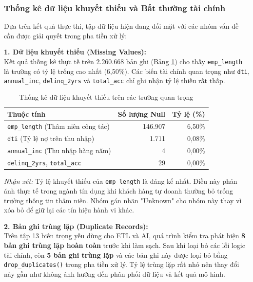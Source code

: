 \subsubsection{Thống kê dữ liệu khuyết thiếu và Bất thường tài chính}

Dựa trên kết quả thực thi, tập dữ liệu hiện đang đối mặt với các nhóm vấn đề cần được giải quyết trong pha tiền xử lý:

\textbf{1. Dữ liệu khuyết thiếu (Missing Values):} \\
Kết quả thống kê thực tế trên 2.260.668 bản ghi (Bảng \ref{tab:missing_values_updated}) cho thấy \texttt{emp\_length} là trường có tỷ lệ trống cao nhất (6,50\%). Các biến tài chính quan trọng như \texttt{dti}, \texttt{annual\_inc}, \texttt{delinq\_2yrs} và \texttt{total\_acc} chỉ ghi nhận tỷ lệ thiếu rất thấp.

\begin{table}[H]
    \centering
    \renewcommand{\arraystretch}{1.2}
    \begin{tabular}{|l|r|r|}
        \hline
        \textbf{Thuộc tính} & \textbf{Số lượng Null} & \textbf{Tỷ lệ (\%)} \\ \hline
        \texttt{emp\_length} (Thâm niên công tác) & 146.907 & 6,50\% \\ \hline
        \texttt{dti} (Tỷ lệ nợ trên thu nhập) & 1.711 & 0,08\% \\ \hline
        \texttt{annual\_inc} (Thu nhập hàng năm) & 4 & 0,00\% \\ \hline
        \texttt{delinq\_2yrs}, \texttt{total\_acc} & 29 & 0,00\% \\ \hline
    \end{tabular}
    \caption{Thống kê dữ liệu khuyết thiếu trên các trường quan trọng}
    \label{tab:missing_values_updated}
\end{table}

\textit{Nhận xét:} Tỷ lệ khuyết thiếu của \texttt{emp\_length} là đáng kể nhất. Điều này phản ánh thực tế trong ngành tín dụng khi khách hàng tự doanh thường bỏ trống trường thông tin thâm niên. Nhóm gán nhãn "Unknown" cho nhóm này thay vì xóa bỏ để giữ lại các tín hiệu hành vi khác.

\textbf{2. Bản ghi trùng lặp (Duplicate Records):} \\
Trên tập 13 biến trọng yếu dùng cho ETL và AI, quá trình kiểm tra phát hiện \textbf{8 bản ghi trùng lặp hoàn toàn} trước khi làm sạch. Sau khi loại bỏ các lỗi logic tài chính, còn \textbf{5 bản ghi trùng lặp} và các bản ghi này được loại bỏ bằng \texttt{drop\_duplicates()} trong pha tiền xử lý. Tỷ lệ trùng lặp rất nhỏ nên thay đổi này gần như không ảnh hưởng đến phân phối dữ liệu và kết quả mô hình.

